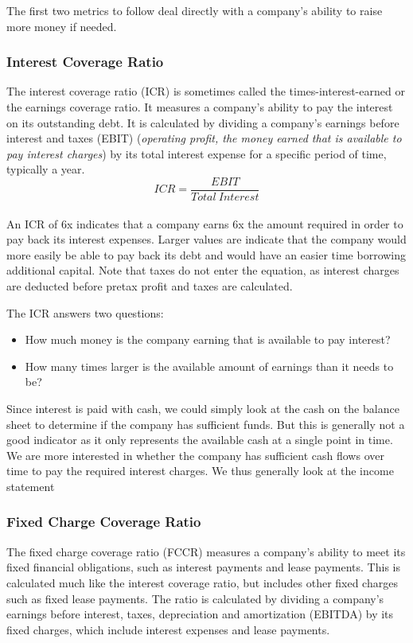\documentclass{article}
\begin{document}
The first two metrics to follow deal directly with a company's ability to raise more money if needed. 

\subsubsection{Interest Coverage Ratio}
The interest coverage ratio (ICR) is sometimes called the times-interest-earned or the earnings coverage ratio. It measures a company's ability to pay the interest on its outstanding debt. It is calculated by dividing a company's earnings before interest and taxes (EBIT) (\textit{operating profit, the money earned that is available to pay interest charges}) by its total interest expense for a specific period of time, typically a year. \\

 \begin{equation}
    ICR = \frac{EBIT}{Total\: Interest}
\end{equation}\\

An ICR of 6x indicates that a company earns 6x the amount required in order to pay back its interest expenses. Larger values are indicate that the company would more easily be able to pay back its debt and would have an easier time borrowing additional capital. Note that taxes do not enter the equation, as interest charges are deducted before pretax profit and taxes are calculated. 

The ICR answers two questions:
\begin{itemize}
\item How much money is the company earning that is available to pay interest?
\item How many times larger is the available amount of earnings than it needs to be?
\end{itemize}

Since interest is paid with cash, we could simply look at the cash on the balance sheet to determine if the company has sufficient funds. But this is generally not a good indicator as it only represents the available cash at a single point in time. We are more interested in whether the company has sufficient cash flows over time to pay the required interest charges. We thus generally look at the income statement


\subsubsection{Fixed Charge Coverage Ratio}
The fixed charge coverage ratio (FCCR) measures a company's ability to meet its fixed financial obligations, such as interest payments and lease payments. This is calculated much like the interest coverage ratio, but includes other fixed charges such as fixed lease payments. The ratio is calculated by dividing a company's earnings before interest, taxes, depreciation and amortization (EBITDA) by its fixed charges, which include interest expenses and lease payments.
\end{document}
